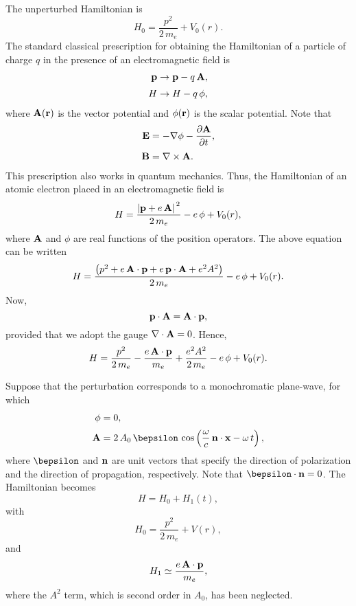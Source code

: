 The unperturbed Hamiltonian
is
\begin{equation}\label{e6.239}
H_0 = \frac{p^2}{2 \,m_e} + V_0(r).
\end{equation}
The standard classical prescription for obtaining the Hamiltonian of
a  particle
of charge $q$
in the presence of an electromagnetic field is
\begin{align}
{\bf p} &\rightarrow {\bf p} - q\,{ \bf A},\\[0.5ex]
H &\rightarrow  H-q\,\phi,
\end{align}
where ${\bf A}(\bf r)$ is the vector potential and $\phi({\bf r})$
is the scalar potential. Note that
\begin{align}
{\bf E} &=  - \nabla\phi - \frac{\partial {\bf A}}{\partial t},\\[0.5ex]
{\bf B} &= \nabla\times {\bf A}.
\end{align}
This prescription also works in quantum mechanics. Thus, the Hamiltonian
of an atomic electron placed in an electromagnetic field is
\begin{equation}
H = \frac{\left|{\bf p} + e\, {\bf A}\right|^{\,2} }{2\,m_e}- e \,\phi + V_0(r),
\end{equation}
where ${\bf A}$ and $\phi$ are real functions of the position operators.
The above equation can be written
\begin{equation}
H = \frac{ \left(p^2 +e \,{\bf A}\cdot {\bf p}
+e \,{\bf p}\cdot{\bf A} + e^2 A^2\right)}{2\,m_e}- e \,\phi + V_0(r).
\end{equation}
Now, 
\begin{equation}
{\bf p}\cdot {\bf A} = {\bf A}\cdot  {\bf p},
\end{equation}
provided that we adopt the gauge $\nabla\cdot{\bf A} = 0$.
Hence,
\begin{equation}\label{e8.132f}
H = \frac{p^2}{2\,m_e} -\frac{e\,{\bf A}\cdot{\bf p}}{m_e}
+\frac{ e^2  A^2}{2\,m_e}- e\, \phi + V_0(r).
\end{equation}

Suppose that the perturbation corresponds to a monochromatic plane-wave, for which
\begin{align}
\phi &= 0,\\[0.5ex]
{\bf A} &= 2\, A_0 \,\bepsilon\,\cos\left
(\frac{\omega}{c} \,{\bf n}\cdot{\bf x}
- \omega\, t\right),
\end{align}
where $\bepsilon$ and ${\bf n}$ are unit vectors that specify the direction
of polarization and the direction of propagation, respectively. 
Note that $\bepsilon\cdot{\bf n} = 0$. The Hamiltonian
becomes
\begin{equation}
H = H_0 + H_1(t),
\end{equation}
with
\begin{equation}
H_0 = \frac{p^2}{2\,m_e}  + V(r),
\end{equation}
and
\begin{equation}
H_1 \simeq \frac{e\,{\bf A}\cdot{\bf p}}{m_e},
\end{equation}
where the $A^2$ term, which is  second order in $A_0$, has been neglected.

